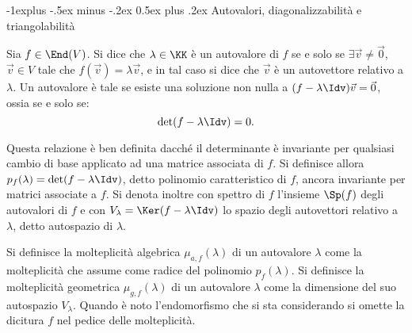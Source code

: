 \documentclass[10pt,landscape]{article}
\makeatletter
\renewcommand{\subsection}{\@startsection{subsection}{2}{0mm}%
	{-1explus -.5ex minus -.2ex}%
	{0.5ex plus .2ex}%
	{\normalfont\normalsize\bfseries}}
\makeatother
\begin{document}
\begin{multicols}{3}
		\subsection{Autovalori, diagonalizzabilità e triangolabilità}
		
		Sia $f \in \End(V)$. Si dice che $\lambda \in \KK$ è un autovalore
		di $f$ se e solo se $\exists \vec{v} \neq \vec{0}$, $\vec{v} \in V$
		tale che $f(\vec{v}) = \lambda \vec{v}$, e in tal caso si dice
		che $\vec{v}$ è un autovettore relativo a $\lambda$. Un autovalore
		è tale se esiste una soluzione non nulla a $(f - \lambda \Idv) \vec{v} = \vec{0}$, ossia se e solo se:
		\[\det(f - \lambda \Idv) = 0. \]
		
		Questa relazione è ben definita dacché il determinante è invariante
		per qualsiasi cambio di base applicato ad una matrice associata
		di $f$. Si definisce allora $p_f(\lambda) = \det(f - \lambda \Idv)$,
		detto polinomio caratteristico di $f$, ancora invariante per
		matrici associate a $f$. Si denota inoltre con
		spettro di $f$ l'insieme $\Sp(f)$ degli autovalori di $f$ e con
		$V_\lambda = \Ker(f - \lambda \Idv)$ lo spazio degli autovettori
		relativo a $\lambda$, detto autospazio di $\lambda$.
		
		Si definisce la molteplicità algebrica $\mu_{a,f}(\lambda)$ di un autovalore
		$\lambda$ come la molteplicità che assume come radice del polinomio
		$p_f(\lambda)$. Si definisce la molteplicità geometrica
		$\mu_{g,f}(\lambda)$ di un autovalore $\lambda$ come la dimensione
		del suo autospazio $V_\lambda$. Quando è noto l'endomorfismo
		che si sta considerando si omette la dicitura $f$ nel pedice delle
		molteplicità.
		

\end{multicols}
\end{document}
